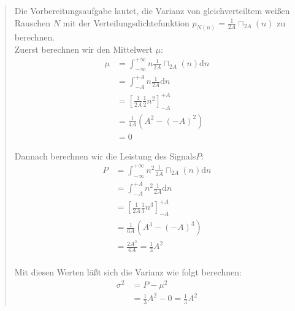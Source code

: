     \begin{quote}
    Die Vorbereitungsaufgabe lautet, die Varianz von gleichverteiltem weißen Rauschen $N$ mit der
    Verteilungsdichtefunktion $p_{N(n)} = \frac{1}{2A} \sqcap_{2A} (n)$ zu berechnen.\\
    Zuerst berechnen wir den Mittelwert $\mu$:
   	\begin{equation*}
    	\begin{split}
    		\mu &= \int_{-\infty}^{+\infty} n \frac{1}{2A} \sqcap_{2A} (n) \mathrm dn\\
    		&= \int_{-A}^{+A} n \frac{1}{2A} \mathrm dn\\
    		&= \left[ \frac{1}{2A} \frac{1}{2} n^2 \right]_{-A}^{+A}\\
    		&= \frac{1}{4A} (A^2-(-A)^2)\\
    		&= 0
    	\end{split}
    \end{equation*}
    
    Dannach berechnen wir die Leistung des Signals$P$:\\
    \begin{equation*}
    	\begin{split}
    		P &= \int_{-\infty}^{+\infty} n^2 \frac{1}{2A} \sqcap_{2A} (n) \mathrm dn\\
    		&= \int_{-A}^{+A} n^2 \frac{1}{2A} \mathrm dn\\
    		&= \left[ \frac{1}{2A} \frac{1}{3} n^3 \right]_{-A}^{+A}\\
    		&= \frac{1}{6A} (A^3-(-A)^3)\\
            &= \frac{2A^3}{6A} = \frac{1}{3} A^2\\
    	\end{split}
    \end{equation*}
    
    Mit diesen Werten läßt sich die Varianz wie folgt berechnen:
    \begin{equation*}
    	\begin{split}
    		\sigma^2 &= P - \mu^2\\
    		&= \frac{1}{3} A^2 - 0 = \frac{1}{3} A^2
    	\end{split}
    \end{equation*}
	\end{quote}
         	


